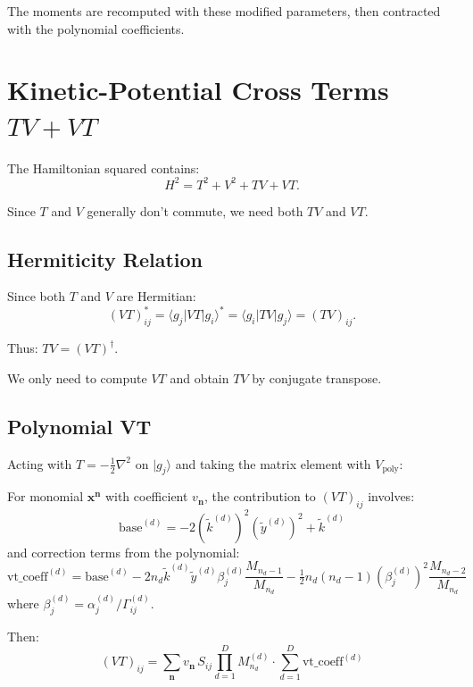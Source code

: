 \documentclass[11pt,a4paper]{article}
\newcommand{\half}{\tfrac{1}{2}}
\theoremstyle{definition}
\begin{document}
The moments are recomputed with these modified parameters, then contracted with the polynomial coefficients.

\section{Kinetic-Potential Cross Terms $TV + VT$}

The Hamiltonian squared contains:
\begin{equation}
H^2 = T^2 + V^2 + TV + VT.
\end{equation}

Since $T$ and $V$ generally don't commute, we need both $TV$ and $VT$.

\subsection{Hermiticity Relation}

Since both $T$ and $V$ are Hermitian:
\begin{equation}
(VT)_{ij}^* = \langle g_j | VT | g_i \rangle^* = \langle g_i | TV | g_j \rangle = (TV)_{ij}.
\end{equation}

Thus: $\boxed{TV = (VT)^\dagger}$.

We only need to compute $VT$ and obtain $TV$ by conjugate transpose.

\subsection{Polynomial VT}

Acting with $T = -\half \nabla^2$ on $|g_j\rangle$ and taking the matrix element with $V_{\text{poly}}$:

\begin{tcolorbox}[colback=purple!5,colframe=purple!50!black,title=Polynomial $VT$ Matrix]
For monomial $\bm{x}^{\bm{n}}$ with coefficient $v_{\bm{n}}$, the contribution to $(VT)_{ij}$ involves:
\begin{equation}
\text{base}^{(d)} = -2(\tilde{k}^{(d)})^2 (\tilde{y}^{(d)})^2 + \tilde{k}^{(d)}
\end{equation}
and correction terms from the polynomial:
\begin{equation}
\text{vt\_coeff}^{(d)} = \text{base}^{(d)} - 2 n_d \tilde{k}^{(d)} \tilde{y}^{(d)} \beta_j^{(d)} \frac{M_{n_d-1}}{M_{n_d}} - \half n_d(n_d-1) (\beta_j^{(d)})^2 \frac{M_{n_d-2}}{M_{n_d}}
\end{equation}
where $\beta_j^{(d)} = \alpha_j^{(d)} / \Gamma_{ij}^{(d)}$.

Then:
\begin{equation}
(VT)_{ij} = \sum_{\bm{n}} v_{\bm{n}} \, S_{ij} \prod_{d=1}^D M_{n_d}^{(d)} \cdot \sum_{d=1}^D \text{vt\_coeff}^{(d)}
\end{equation}
\end{tcolorbox}
\end{document}
